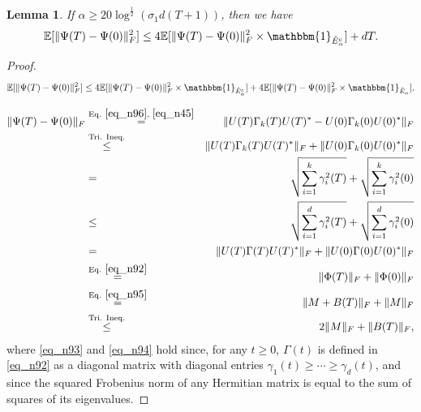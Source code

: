 \documentclass[11pt,letterpaper]{article}
\newtheorem{lemma}[theorem]{Lemma}
\begin{document}
\begin{lemma}\label{lemma_utility_rare_event}
%
If $\alpha \geq 20\log^{\frac{1}{2}}(\sigma_1 d (T+1))$, then we have
%
\begin{equation*}
    \mathbb{E}[\|\Psi(T) - \Psi(0)\|_F^2] \leq 4\mathbb{E}[\|\Psi(T) - \Psi(0)\|_F^2 \times \mathbbm{1}_{\hat{E}_\alpha^c}] +dT.
    \end{equation*}
\end{lemma}
%
\begin{proof}

\begin{equation}\label{eq_u12}
    \mathbb{E}[\|\Psi(T) - \Psi(0)\|_F^2] \leq 4\mathbb{E}[\|\Psi(T) - \Psi(0)\|_F^2 \times \mathbbm{1}_{\hat{E}_\alpha^c}] + 4\mathbb{E}[\|\Psi(T) - \Psi(0)\|_F^2 \times \mathbbm{1}_{\hat{E}_\alpha}]. 
\end{equation}

\begin{eqnarray}
    \|\Psi(T) - \Psi(0)\|_F &\stackrel{\textrm{Eq. } \eqref{eq_n96},\, \, \eqref{eq_n45}}{=}& \| U(T) \Gamma_k(T) U(T)^\ast - U(0) \Gamma_k(0) U(0)^\ast\|_F \nonumber\\
&\stackrel{\textrm{Tri. Ineq.}}{\leq}  & \| U(T) \Gamma_k(T) U(T)^\ast\|_F + \|U(0) \Gamma_k(0) U(0)^\ast\|_F \nonumber\\
  &= & \sqrt{\sum_{i=1}^k \gamma_i^2(T)} + \sqrt{\sum_{i=1}^k \gamma_i^2(0)} \label{eq_n93}\\
  & \leq & \sqrt{\sum_{i=1}^d \gamma_i^2(T)} + \sqrt{\sum_{i=1}^d \gamma_i^2(0)} \nonumber\\
    &=& \| U(T) \Gamma(T) U(T)^\ast\|_F + \|U(0) \Gamma(0) U(0)^\ast\|_F \label{eq_n90} \label{eq_n94}\\
     &\stackrel{\textrm{Eq. } \eqref{eq_n92}}{=}&  \|\Phi(T)\|_F+ \|\Phi(0)\|_F \nonumber\\
    &\stackrel{\textrm{Eq. } \eqref{eq_n95}}{=}& \|M + B(T)\|_F + \|M\|_F \nonumber\\
    &\stackrel{\textrm{Tri. Ineq.}}{\leq}  & 2\|M\|_F +\|B(T)\|_F, \label{eq_n91}
\end{eqnarray}
%
where \eqref{eq_n93} and \eqref{eq_n94} hold since, for any $t\geq 0$, $\Gamma(t)$ is defined in \eqref{eq_n92} as a diagonal matrix with diagonal entries $\gamma_1(t) \geq \cdots \geq \gamma_d(t)$, and since the squared Frobenius norm of any Hermitian matrix is equal to the sum of squares of its eigenvalues.


\end{proof}
\end{document}
